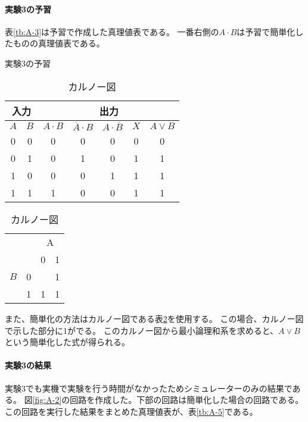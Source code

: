 \documentclass[dvipdfmx]{jsarticle}
\begin{document}
\paragraph{実験3の予習}
表\ref*{tb:A-3}は予習で作成した真理値表である。
一番右側の$A \cdot B$は予習で簡単化したものの真理値表である。

\begin{table}[h]
  \begin{minipage}[c]{0.5\textwidth}
    \centering
    \caption{実験3の予習}
    \begin{tabular}{|c|c||c|c|c|c|c|} \hline
      \multicolumn{2}{|c||}{入力} & \multicolumn{5}{c|}{出力} \\ \hline
      $A$ & $B$ & $A \cdot B$ & $\overline{A} \cdot B$ & $A \cdot \overline{B}$ & $X$ & $A \vee B$ \\ \hline
      0 & 0 & 0 & 0 & 0 & 0 & 0\\ \hline
      0 & 1 & 0 & 1 & 0 & 1 & 1\\ \hline
      1 & 0 & 0 & 0 & 1 & 1 & 1\\ \hline
      1 & 1 & 1 & 0 & 0 & 1 & 1\\ \hline
    \end{tabular}
    \label{tb:A-3}
  \end{minipage}
  \begin{minipage}[c]{0.5\textwidth}
  \centering
    \caption{カルノー図}
    \begin{tabular}{|c|c|c|c|}\hline
      \multicolumn{2}{|c|}{} & \multicolumn{2}{c|}{A}\\ \cline{3-4}
      \multicolumn{2}{|c|}{} & 0 & 1\\ \hline
          $B$ & 0 &  & 1\\ \cline{2-4}
            & 1 & 1 & 1\\ \hline
      \end{tabular}
    \label{tb:A-4}
  \end{minipage}
\end{table}

また、簡単化の方法はカルノー図である表\ref*{tb:A-4}を使用する。
この場合、カルノー図で示した部分に1がでる。
このカルノー図から最小論理和系を求めると、$A \vee B$という簡単化した式が得られる。

\paragraph{実験3の結果}

実験3でも実機で実験を行う時間がなかったためシミュレーターのみの結果である。
図\ref*{fig:A-2}の回路を作成した。下部の回路は簡単化した場合の回路である。
この回路を実行した結果をまとめた真理値表が、表\ref*{tb:A-5}である。
\end{document}
